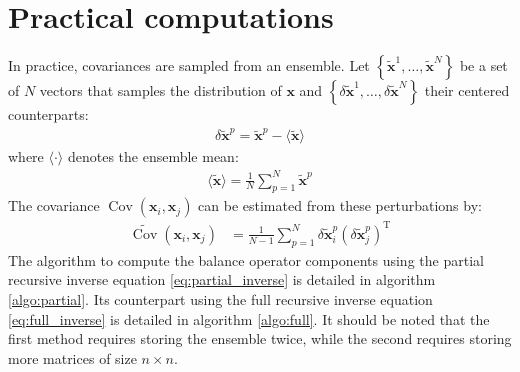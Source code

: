 \documentclass[12pt]{article}
\DeclareMathOperator{\Cov}{Cov}
\begin{document}
\section{Practical computations}
In practice, covariances are sampled from an ensemble. Let $\left\{\widetilde{\mathbf{x}}^1,\dots,\widetilde{\mathbf{x}}^N\right\}$ be a set of $N$ vectors that samples the distribution of $\mathbf{x}$ and $\left\{\delta \widetilde{\mathbf{x}}^1,\dots,\delta \widetilde{\mathbf{x}}^N\right\}$ their centered counterparts:
\begin{align}
\delta \widetilde{\mathbf{x}}^p = \widetilde{\mathbf{x}}^p - \langle \widetilde{\mathbf{x}} \rangle
\end{align}
where $\langle \cdot \rangle$ denotes the ensemble mean:
\begin{align}
\label{eq:exp_estim}
\langle \widetilde{\mathbf{x}} \rangle = \frac{1}{N} \sum_{p=1}^N \widetilde{\mathbf{x}}^p
\end{align}
The covariance $\Cov \left(\mathbf{x}_i,\mathbf{x}_j\right)$ can be estimated from these perturbations by:
\begin{align}
\label{eq:cov_estim}
\widetilde{\Cov}\left(\mathbf{x}_i,\mathbf{x}_j\right) & = \frac{1}{N-1} \sum_{p=1}^N \delta \widetilde{\mathbf{x}}^p_i \left(\delta \widetilde{\mathbf{x}}^p_j\right)^\mathrm{T}
\end{align}
$ $\\
The algorithm to compute the balance operator components using the partial recursive inverse equation \eqref{eq:partial_inverse} is detailed in algorithm \ref{algo:partial}. Its counterpart using the full recursive inverse equation \eqref{eq:full_inverse} is detailed in algorithm \ref{algo:full}. It should be noted that the first method requires storing the ensemble twice, while the second requires storing more matrices of size $n \times n$.
\end{document}
